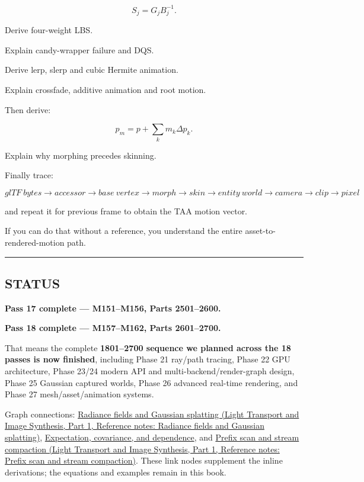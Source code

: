 \[
S_j=
G_jB_j^{-1}.
\]

Derive four-weight LBS.

Explain candy-wrapper failure and DQS.

Derive lerp, slerp and cubic Hermite animation.

Explain crossfade, additive animation and root motion.

Then derive:

\[
p_m=
p+
\sum_km_k\Delta p_k.
\]

Explain why morphing precedes skinning.

Finally trace:

\[
\boxed{
glTF\ bytes
\rightarrow
accessor
\rightarrow
base\ vertex
\rightarrow
morph
\rightarrow
skin
\rightarrow
entity\ world
\rightarrow
camera
\rightarrow
clip
\rightarrow
pixel
}
\]

and repeat it for previous frame to obtain the TAA motion vector.

If you can do that without a reference, you understand the entire asset-to-rendered-motion path.

\begin{center}\rule{0.5\linewidth}{0.5pt}\end{center}

\subsection{STATUS}\label{04-visual-computing-ii-ch041-status}

\hypertarget{04-visual-computing-ii-ch041-status}{}

\textbf{Pass 17 complete --- M151--M156, Parts 2501--2600.}

\textbf{Pass 18 complete --- M157--M162, Parts 2601--2700.}

That means the complete \textbf{1801--2700 sequence we planned across the 18 passes is now finished}, including Phase 21 ray/path tracing, Phase 22 GPU architecture, Phase 23/24 modern API and multi-backend/render-graph design, Phase 25 Gaussian captured worlds, Phase 26 advanced real-time rendering, and Phase 27 mesh/asset/animation systems.

Graph connections: \href{../04-Light-Transport-and-Image-Synthesis-P01/main.pdf\#nameddest=appendix-c5b332e400e7}{Radiance fields and Gaussian splatting (Light Transport and Image Synthesis, Part 1, Reference notes: Radiance fields and Gaussian splatting)}, \hyperref[appendix-54c383df9992]{Expectation, covariance, and dependence}, and \href{../04-Light-Transport-and-Image-Synthesis-P01/main.pdf\#nameddest=appendix-f2ee4d086415}{Prefix scan and stream compaction (Light Transport and Image Synthesis, Part 1, Reference notes: Prefix scan and stream compaction)}. These link nodes supplement the inline derivations; the equations and examples remain in this book.

